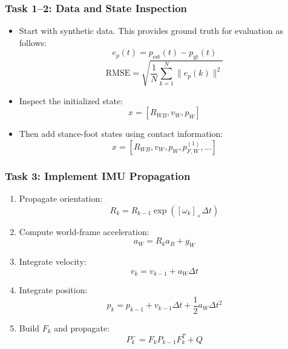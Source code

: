 \documentclass[aspectratio=169]{beamer}
\begin{document}
\begin{frame}
	\frametitle{Task 1--2: Data and State Inspection}
	
	\begin{itemize}
		\item Start with synthetic data. This provides ground truth for evaluation as follows:
		\[
		e_p(t) = p_{\text{est}}(t) - p_{\text{gt}}(t)
		\]
		\[
		\mathrm{RMSE}
		=
		\sqrt{
			\frac{1}{N}
			\sum_{k=1}^{N}
			\|e_p(k)\|^2
		}
		\]
		
		\item Inspect the initialized state:
		\[
		x =
		[R_{WB}, v_W, p_W]
		\]
		
		\item Then add stance-foot states using contact information:
		\[
		x =
		[R_{WB}, v_W, p_W, p^{(1)}_{F,W}, \ldots]
		\]
	\end{itemize}
	
\end{frame}


\begin{frame}
	\frametitle{Task 3: Implement IMU Propagation}
	
	\begin{enumerate}
		\item Propagate orientation:
		\[
		R_k = R_{k-1}\exp([\omega_k]_\times\Delta t)
		\]
		
		\item Compute world-frame acceleration:
		\[
		a_W = R_ka_B + g_W
		\]
		
		\item Integrate velocity:
		\[
		v_k = v_{k-1} + a_W\Delta t
		\]
		
		\item Integrate position:
		\[
		p_k =
		p_{k-1}
		+ v_{k-1}\Delta t
		+ \frac{1}{2}a_W\Delta t^2
		\]
		
		\item Build $F_k$ and propagate:
		\[
		P_k^- = F_kP_{k-1}F_k^T + Q
		\]
	\end{enumerate}
	
\end{frame}
\end{document}
